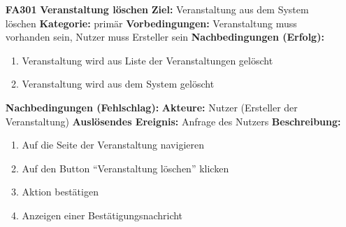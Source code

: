 \documentclass[parskip=full]{scrartcl}
\begin{document}
\begin{itemize}[nosep]
			\item[\textbf{FA301}]\textbf{Veranstaltung löschen}
				\newline \textbf{Ziel:} Veranstaltung aus dem System löschen
				\newline \textbf{Kategorie:} primär
				\newline \textbf{Vorbedingungen:} Veranstaltung muss vorhanden sein, Nutzer muss Ersteller sein
				\newline \textbf{Nachbedingungen (Erfolg):} 
				\begin{enumerate}[nosep]
					\item Veranstaltung wird aus Liste der Veranstaltungen gelöscht
					\item Veranstaltung wird aus dem System gelöscht
				\end{enumerate}
				\textbf{Nachbedingungen (Fehlschlag):}
				\newline \textbf{Akteure:}  Nutzer (Ersteller der Veranstaltung)
				\newline \textbf{Auslösendes Ereignis:} Anfrage des Nutzers
				\newline \textbf{Beschreibung:}
				\begin{enumerate}[nosep]
					\item Auf die Seite der Veranstaltung navigieren
					\item Auf den Button “Veranstaltung löschen” klicken
					\item Aktion bestätigen
					\item Anzeigen einer Bestätigungsnachricht\\
				\end{enumerate}
			

\end{itemize}
\end{document}
